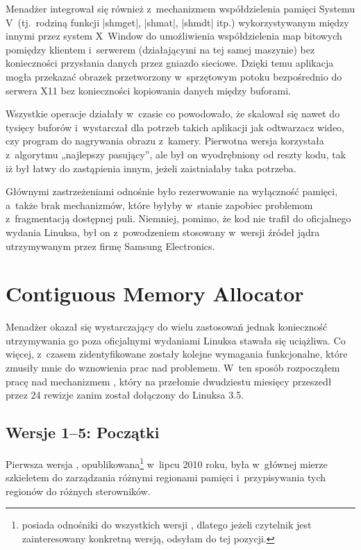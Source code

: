 Menadżer  integrował się również z~mechanizmem współdzielenia
pamięci Systemu V~(tj.\ rodziną funkcji \code|shmget|, \code|shmat|,
\code|shmdt| itp.) wykorzystywanym między innymi przez system X~Window
do umożliwienia współdzielenia map bitowych pomiędzy klientem
i~serwerem (działającymi na tej samej maszynie) bez konieczności
przysłania danych przez gniazdo sieciowe.  Dzięki temu aplikacja mogła
przekazać obrazek przetworzony w~sprzętowym potoku bezpośrednio do
serwera X11 bez konieczności kopiowania danych między buforami.

Wszystkie operacje  działały w~czasie  co
powodowało, że  skalował się nawet do tysięcy buforów
i~wystarczał dla potrzeb takich aplikacji jak odtwarzacz wideo, czy
program do nagrywania obrazu z~kamery.  Pierwotna wersja korzystała
z~algorytmu „najlepszy pasujący”, ale był on wyodrębniony od reszty
kodu, tak iż był łatwy do zastąpienia innym, jeżeli zaistniałaby taka
potrzeba.

Głównymi zastrzeżeniami odnośnie  było rezerwowanie na
wyłączność pamięci, a~także brak mechanizmów, które byłyby w~stanie
zapobiec problemom z~fragmentacją dostępnej puli.  Niemniej, pomimo,
że kod nie trafił do oficjalnego wydania Linuksa, był on z~powodzeniem
stosowany w~wersji źródeł jądra utrzymywanym przez firmę Samsung
Electronics.


\section{Contiguous Memory Allocator}

Menadżer  okazał się wystarczający do wielu zastosowań jednak
konieczność utrzymywania go poza oficjalnymi wydaniami Linuksa stawała
się uciążliwa.  Co więcej, z~czasem zidentyfikowane zostały kolejne
wymagania funkcjonalne, które zmusiły mnie do wznowienia prac nad
problemem.  W~ten sposób rozpocząłem pracę nad mechanizmem ,
który na przełomie dwudziestu miesięcy przeszedł przez 24 rewizje
zanim został dołączony do Linuksa 3.5.

\subsection{Wersje 1--5: Początki}\label{sec:evo-cma}

Pierwsza wersja , opublikowana\footnote{\autocite{patch:cma-24}
  posiada odnośniki do wszystkich wersji , dlatego jeżeli czytelnik
  jest zainteresowany konkretną wersją, odsyłam do tej pozycji.}
w~lipcu 2010 roku, była w~głównej mierze szkieletem do zarządzania
różnymi regionami pamięci i~przypisywania tych regionów do różnych
sterowników.

